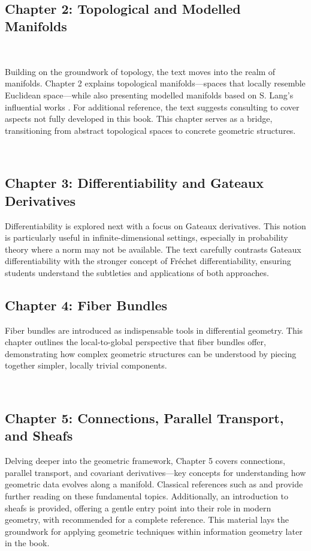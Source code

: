\, 

\subsection*{\bf Chapter 2: Topological and Modelled Manifolds}~

Building on the groundwork of topology, the text moves into the realm of manifolds. Chapter 2 explains topological manifolds—spaces that locally resemble Euclidean space—while also presenting modelled manifolds based on S. Lang’s influential works \cite{L95,L99}. For additional reference, the text suggests consulting \cite{Mil65} to cover aspects not fully developed in this book. This chapter serves as a bridge, transitioning from abstract topological spaces to concrete geometric structures.

\,

\subsection*{\bf Chapter 3: Differentiability and Gateaux Derivatives}
Differentiability is explored next with a focus on Gateaux derivatives. This notion is particularly useful in infinite-dimensional settings, especially in probability theory where a norm may not be available. The text carefully contrasts Gateaux differentiability with the stronger concept of Fréchet differentiability, ensuring students understand the subtleties and applications of both approaches.
\,

\subsection*{\bf Chapter 4: Fiber Bundles}
Fiber bundles are introduced as indispensable tools in differential geometry. This chapter outlines the local-to-global perspective that fiber bundles offer, demonstrating how complex geometric structures can be understood by piecing together simpler, locally trivial components.

\,

\subsection*{\bf Chapter 5: Connections, Parallel Transport, and Sheafs}
Delving deeper into the geometric framework, Chapter 5 covers connections, parallel transport, and covariant derivatives—key concepts for understanding how geometric data evolves along a manifold. Classical references such as \cite{KoNo96} and \cite{Sik} provide further reading on these fundamental topics. Additionally, an introduction to sheafs is provided, offering a gentle entry point into their role in modern geometry, with \cite{KS90} recommended for a complete reference. This material lays the groundwork for applying geometric techniques within information geometry later in the book.

